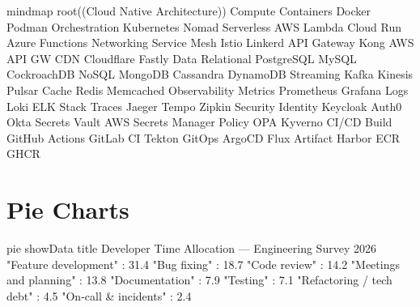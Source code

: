 \documentclass[12pt, a4paper]{article}
\begin{document}
\begin{mermaid}[
    type    = mindmap,
    theme   = forest,
    caption = {Cloud-native architecture concept map},
    label   = {fig:cloudmind},
    width   = \linewidth
]
mindmap
  root((Cloud Native Architecture))
    Compute
      Containers
        Docker
        Podman
      Orchestration
        Kubernetes
        Nomad
      Serverless
        AWS Lambda
        Cloud Run
        Azure Functions
    Networking
      Service Mesh
        Istio
        Linkerd
      API Gateway
        Kong
        AWS API GW
      CDN
        Cloudflare
        Fastly
    Data
      Relational
        PostgreSQL
        MySQL
        CockroachDB
      NoSQL
        MongoDB
        Cassandra
        DynamoDB
      Streaming
        Kafka
        Kinesis
        Pulsar
      Cache
        Redis
        Memcached
    Observability
      Metrics
        Prometheus
        Grafana
      Logs
        Loki
        ELK Stack
      Traces
        Jaeger
        Tempo
        Zipkin
    Security
      Identity
        Keycloak
        Auth0
        Okta
      Secrets
        Vault
        AWS Secrets Manager
      Policy
        OPA
        Kyverno
    CI/CD
      Build
        GitHub Actions
        GitLab CI
        Tekton
      GitOps
        ArgoCD
        Flux
      Artifact
        Harbor
        ECR
        GHCR
\end{mermaid}

\section{Pie Charts}

\begin{mermaid}[
    type    = pie,
    theme   = sunset,
    caption = {Developer time allocation across engineering activities},
    label   = {fig:devtime},
    width   = 0.75\linewidth
]
pie showData
    title Developer Time Allocation — Engineering Survey 2026
    "Feature development"     : 31.4
    "Bug fixing"              : 18.7
    "Code review"             : 14.2
    "Meetings and planning"   : 13.8
    "Documentation"           :  7.9
    "Testing"                 :  7.1
    "Refactoring / tech debt" :  4.5
    "On-call & incidents"     :  2.4
\end{mermaid}
\end{document}
